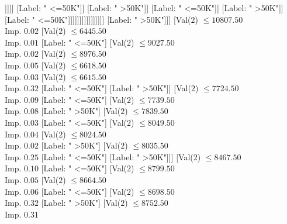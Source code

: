 \documentclass[margin=10pt]{standalone}
\begin{document}
\begin{forest}
																																	[Label: " <=50K"]
																																	[Val($2$) $ \leq 4522.50$ \\ Imp. $0.31$
																																		[Label: " >50K"]
																																		[Label: " <=50K"]]]]]
																														[Label: " <=50K"]]
																													[Label: " >50K"]]
																												[Label: " <=50K"]]
																											[Label: " >50K"]]
																										[Label: " <=50K"]]]]]]]]]]]]]]]]
											[Label: " >50K"]]]
									[Val($2$) $ \leq 10807.50$ \\ Imp. $0.02$
										[Val($2$) $ \leq 6445.50$ \\ Imp. $0.01$
											[Label: " <=50K"]
											[Val($2$) $ \leq 9027.50$ \\ Imp. $0.02$
												[Val($2$) $ \leq 8976.50$ \\ Imp. $0.05$
													[Val($2$) $ \leq 6618.50$ \\ Imp. $0.03$
														[Val($2$) $ \leq 6615.50$ \\ Imp. $0.32$
															[Label: " <=50K"]
															[Label: " >50K"]]
														[Val($2$) $ \leq 7724.50$ \\ Imp. $0.09$
															[Label: " <=50K"]
															[Val($2$) $ \leq 7739.50$ \\ Imp. $0.08$
																[Label: " >50K"]
																[Val($2$) $ \leq 7839.50$ \\ Imp. $0.03$
																	[Label: " <=50K"]
																	[Val($2$) $ \leq 8049.50$ \\ Imp. $0.04$
																		[Val($2$) $ \leq 8024.50$ \\ Imp. $0.02$
																			[Label: " >50K"]
																			[Val($2$) $ \leq 8035.50$ \\ Imp. $0.25$
																				[Label: " <=50K"]
																				[Label: " >50K"]]]
																		[Val($2$) $ \leq 8467.50$ \\ Imp. $0.10$
																			[Label: " <=50K"]
																			[Val($2$) $ \leq 8799.50$ \\ Imp. $0.05$
																				[Val($2$) $ \leq 8664.50$ \\ Imp. $0.06$
																					[Label: " <=50K"]
																					[Val($2$) $ \leq 8698.50$ \\ Imp. $0.32$
																						[Label: " >50K"]
																						[Val($2$) $ \leq 8752.50$ \\ Imp. $0.31$

\end{forest}
\end{document}
